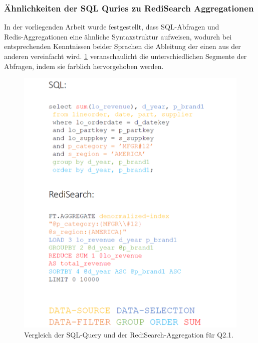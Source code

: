 \subsubsection{Ähnlichkeiten der SQL Quries zu RediSearch Aggregationen}
In der vorliegenden Arbeit wurde festgestellt, dass SQL-Abfragen und\\ Redis-Aggregationen eine ähnliche Syntaxstruktur aufweisen, wodurch bei entsprechenden Kenntnissen beider Sprachen die Ableitung der einen aus der anderen vereinfacht wird. \cref{pic:sql-redis-similiar} veranschaulicht die unterschiedlichen Segmente der Abfragen, indem sie farblich hervorgehoben werden.
\newpage
\begin{figure}[ht]  %
    \centering      %
    \includegraphics[width=1\textwidth]{pictures/sql-redisearch-similiar.png}
    \caption{Vergleich der SQL-Query und der RediSearch-Aggregation für Q2.1.}      %
    \label{pic:sql-redis-similiar}    %
\end{figure}
\newpage
